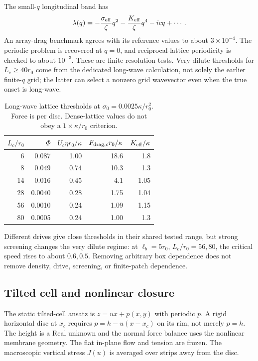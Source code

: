 The small-$q$ longitudinal band has
\begin{equation}
\lambda(q)=-\frac{\sigma_{\rm eff}}{\zeta}q^2-\frac{K_{\rm eff}}{\zeta}q^4-icq+\cdots.
\end{equation}
An array-drag benchmark agrees with its reference values to about $3\times10^{-4}$. The periodic problem is recovered at $q=0$, and reciprocal-lattice periodicity is checked to about $10^{-3}$. These are finite-resolution tests. Very dilute thresholds for $L_c\geq40r_0$ come from the dedicated long-wave calculation, not solely the earlier finite-$q$ grid; the latter can select a nonzero grid wavevector even when the true onset is long-wave.

\begin{table}[h]\centering\small
\begin{tabular}{rrrrr}\toprule $L_c/r_0$ & $\Phi$ & $U_c\eta r_0/\kappa$ & $F_{\rm drag,c}r_0/\kappa$ & $K_{\rm eff}/\kappa$\\\midrule
6&0.087&1.00&18.6&1.8\\8&0.049&0.74&10.3&1.3\\14&0.016&0.45&4.1&1.05\\28&0.0040&0.28&1.75&1.04\\56&0.0010&0.24&1.09&1.15\\80&0.0005&0.24&1.00&1.3\\\bottomrule
\end{tabular}
\caption{Long-wave lattice thresholds at $\sigma_0=0.0025\kappa/r_0^2$. Force is per disc. Dense-lattice values do not obey a $1\times\kappa/r_0$ criterion.}
\end{table}
Different drives give close thresholds in their shared tested range, but strong screening changes the very dilute regime: at $\ell_b=5r_0$, $L_c/r_0=56,80$, the critical speed rises to about $0.6,0.5$. Removing arbitrary box dependence does not remove density, drive, screening, or finite-patch dependence.

\subsection{Tilted cell and nonlinear closure}
The static tilted-cell ansatz is $z=ux+p(x,y)$ with periodic $p$. A rigid horizontal disc at $x_c$ requires $p=h-u(x-x_c)$ on its rim, not merely $p=h$. The height is a Real unknown and the normal force balance uses the nonlinear membrane geometry. The flat in-plane flow and tension are frozen. The macroscopic vertical stress $J(u)$ is averaged over strips away from the disc.

